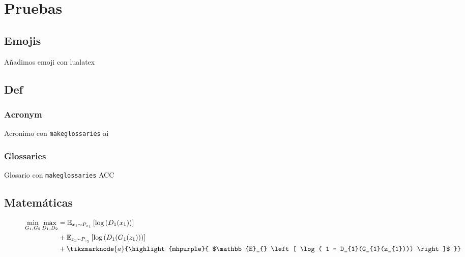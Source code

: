 \chapter*{Pruebas}

\section*{Emojis}

Añadimos emoji con lualatex {}

\section*{Def}

\subsection*{Acronym}

Acronimo con \texttt{makeglossaries} \acrshort{ai}

\subsection*{Glossaries}

Glosario con \texttt{makeglossaries} \gls{ACC}

\section*{Matemáticas}

% 

\begin{wrapfigure}{l}{\columnwidth}
    \vspace{\baselineskip}
    \begin{equation}
        \begin{split}
            \min_{G_{1},G_{2}}\max_{D_{1},D_{2}}
             & = \mathbb{E}_{x_{1}\sim{}P_{x_{1}}} \left[ \log{\left( D_{1}(x_{1})        \right)} \right] \\
             & + \mathbb{E}_{z_{1}\sim{}P_{z_{1}}} \left[ \log{\left( D_{1}(G_{1}(z_{1})) \right)} \right] \\
             & + \tikzmarknode{a}{\highlight{mhpurple}{
                    $\mathbb{E}_{} \left[ \log( 1 - D_{1}(G_{1}(z_{1}))) \right]$
                }}
        \end{split}
    \end{equation}
    \vspace{1.2\baselineskip}
\end{wrapfigure}